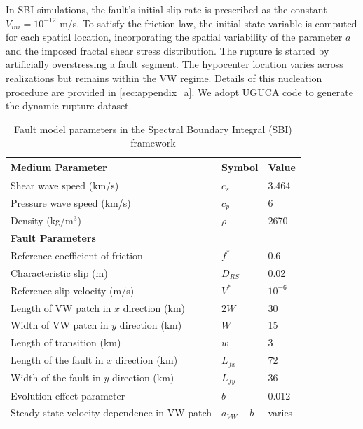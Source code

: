 \documentclass[draft]{agujournal2019}
\begin{document}
In SBI simulations, the fault's initial slip rate is prescribed as the constant $V_{ini}=10^{-12}$ m/s. To satisfy the friction law, the initial state variable is computed for each spatial location, incorporating the spatial variability of the parameter $a$ and the imposed fractal shear stress distribution. The rupture is started by artificially overstressing a fault segment. The hypocenter location varies across realizations but remains within the VW regime. Details of this nucleation procedure are provided in \ref{sec:appendix_a}. We adopt UGUCA code \cite{kammer2021uguca} to generate the dynamic rupture dataset.



\begin{table}[ht!]
\caption{\label{table:2D_parameters}Fault model parameters in the Spectral Boundary Integral (SBI) framework}
\centering
\begin{tabular}{@{}lll@{}}
\toprule
\textbf{Medium Parameter}       & \textbf{Symbol} & \textbf{Value} \\ \midrule
Shear wave speed (km/s)         & $c_s$           & 3.464            \\
Pressure wave speed (km/s)      & $c_p$           & 6            \\
Density (kg/m\(^3\))            & $\rho$          & 2670         \\\midrule
\textbf{Fault Parameters}       &                 &                \\ \midrule
Reference coefficient of friction & $f^*$          & 0.6            \\
Characteristic slip (m)         & $D_{RS}$             & 0.02             \\
Reference slip velocity (m/s)   & $V^*$           & $10^{-6}$      \\
Length of VW patch in $x$ direction (km)          & $2W$        & 30             \\
Width of VW patch in $y$ direction (km)          & $W$        & 15             \\
Length of transition (km)        & $w$     & 3             \\
Length of the fault in $x$ direction (km)         & $L_{fx}$           & 72             \\
Width of the fault in $y$ direction (km)         & $L_{fy}$           & 36             \\
Evolution effect parameter      & $b$             & 0.012          \\
Steady state velocity dependence in VW patch & $a_{VW} - b$ & varies \\

\end{tabular}
\end{table}
\end{document}
